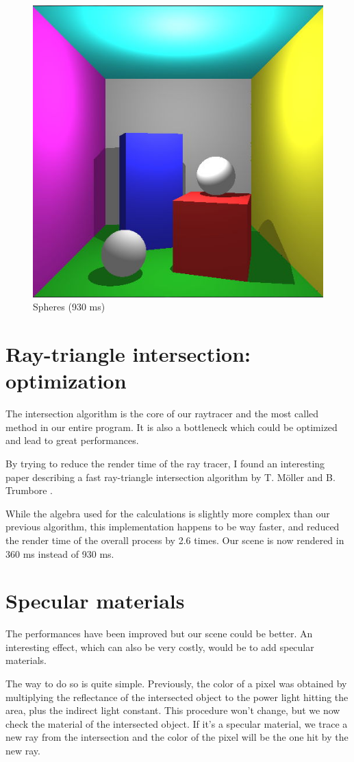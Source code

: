\begin{figure}[H]
\centering
\includegraphics[width=0.4\linewidth]{img/spheres.jpg}
\caption{Spheres (930 ms)}
\end{figure}


\section{Ray-triangle intersection: optimization}
The intersection algorithm is the core of our raytracer and the most called method in our entire program. It is also a bottleneck which could be optimized and lead to great performances.

By trying to reduce the render time of the ray tracer, I found an interesting paper describing a fast ray-triangle intersection algorithm by T. Möller and B. Trumbore \cite{moller2005fast}.

While the algebra used for the calculations is slightly more complex than our previous algorithm, this implementation happens to be way faster, and reduced the render time of the overall process by 2.6 times. Our scene is now rendered in 360 ms instead of 930 ms.


\section{Specular materials}
The performances have been improved but our scene could be better. An interesting effect, which can also be very costly, would be to add specular materials.

The way to do so is quite simple. Previously, the color of a pixel was obtained by multiplying the reflectance of the intersected object to the power light hitting the area, plus the indirect light constant. This procedure won't change, but we now check the material of the intersected object. If it's a specular material, we trace a new ray from the intersection and the color of the pixel will be the one hit by the new ray.

